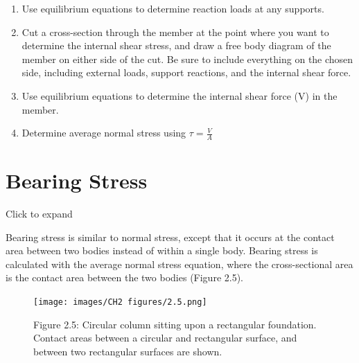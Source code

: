 \documentclass[
  letterpaper,
  DIV=11,
  numbers=noendperiod]{scrreprt}
\begin{document}
\begin{tcolorbox}[enhanced jigsaw, breakable, opacityback=0, toptitle=1mm, left=2mm, colback=white, opacitybacktitle=0.6, colframe=quarto-callout-warning-color-frame, titlerule=0mm, arc=.35mm, leftrule=.75mm, bottomtitle=1mm, colbacktitle=quarto-callout-warning-color!10!white, rightrule=.15mm, title={Step-by-step: Average Shear stress}, bottomrule=.15mm, toprule=.15mm, coltitle=black]

\begin{enumerate}
\def\labelenumi{\arabic{enumi}.}
\item
  Use equilibrium equations to determine reaction loads at any supports.
\item
  Cut a cross-section through the member at the point where you want to
  determine the internal shear stress, and draw a free body diagram of
  the member on either side of the cut. Be sure to include everything on
  the chosen side, including external loads, support reactions, and the
  internal shear force.
\item
  Use equilibrium equations to determine the internal shear force (V) in
  the member.
\item
  Determine average normal stress using \(\tau=\frac{V}{A}\)
\end{enumerate}

\end{tcolorbox}

\section{Bearing Stress}\label{sec-2.3}

Click to expand

Bearing stress is similar to normal stress, except that it occurs at the
contact area between two bodies instead of within a single body. Bearing
stress is calculated with the average normal stress equation, where the
cross-sectional area is the contact area between the two bodies (Figure
2.5).

\begin{figure}[H]

{\centering \texttt{[image: images/CH2 figures/2.5.png]}

}

\caption{Figure 2.5: Circular column sitting upon a rectangular
foundation. Contact areas between a circular and rectangular surface,
and between two rectangular surfaces are shown.}

\end{figure}%
\end{document}
